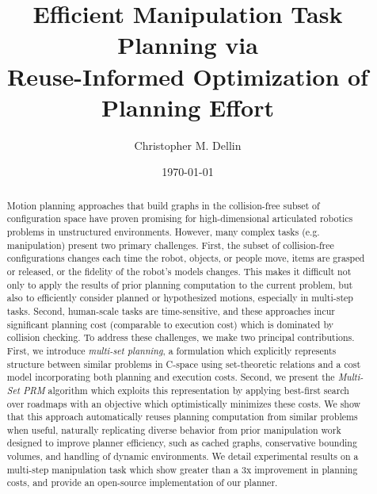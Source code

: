 \documentclass{report}
\title{Efficient Manipulation Task Planning via\\
   Reuse-Informed Optimization of Planning Effort}
\author{Christopher M. Dellin}
\date{\today}
\newcommand{\cdnote}[1]{{\xxnote{CD}{blue}{#1}}}
\newcommand{\xxnote}[3]{}
\renewcommand{\xxnote}[3]{\color{#2}{#1: #3}}
\begin{document}
\maketitle

\begin{abstract}
\cdnote{This is still from the RSS paper.
The intro is more up-to-date.}
Motion planning approaches that build graphs
in the collision-free subset of configuration space
have proven promising
for high-dimensional articulated robotics problems
in unstructured environments.
However, many complex tasks (e.g. manipulation)
present two primary challenges.
First, the subset of collision-free configurations changes each time
the robot, objects, or people move, items are grasped or released,
or the fidelity of the robot's models changes.
This makes it difficult not only to apply the results of prior
planning computation to the current problem,
but also to efficiently consider planned or hypothesized motions,
especially in multi-step tasks.
Second, human-scale tasks are time-sensitive,
and these approaches incur significant planning cost
(comparable to execution cost)
which is dominated by collision checking.
To address these challenges,
we make two principal contributions.
First, we introduce \emph{multi-set planning},
a formulation which explicitly represents structure
between similar problems in C-space
using set-theoretic relations
and a cost model incorporating both planning and execution costs.
Second, we present the \emph{Multi-Set PRM} algorithm
which exploits this representation
by applying best-first search over roadmaps
with an objective which optimistically minimizes these costs.
We show that this approach automatically reuses planning computation
from similar problems when useful,
naturally replicating diverse behavior from prior
manipulation work designed to improve planner efficiency,
such as cached graphs, conservative bounding volumes,
and handling of dynamic environments.
We detail experimental results on a multi-step
manipulation task which show greater than a 3x improvement
in planning costs,
and provide an open-source implementation of our planner.
\end{abstract}

\tableofcontents












{\small


}
\end{document}
